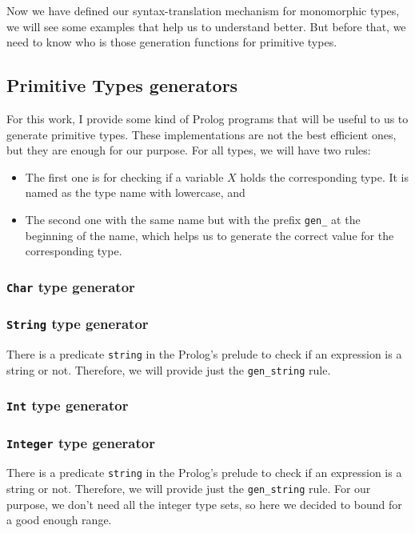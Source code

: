 \documentclass{report}
\theoremstyle{definition}
\theoremstyle{definition}
\newcommand{\ttt}[1]{\texttt{#1}}
\begin{document}
Now we have defined our syntax-translation mechanism for monomorphic types, we will see some examples that help us to understand better. But before that, we need to know who is those generation functions for primitive types.
\subsection{Primitive Types generators}
For this work, I provide some kind of Prolog programs that will be useful to us to generate primitive types. These implementations are not the best efficient ones, but they are enough for our purpose. For all types, we will have two rules:
\begin{itemize}
	\item The first one is for checking if a variable $X$ holds the corresponding type. It is named as the type name with lowercase, and
	\item The second one with the same name but with the prefix \ttt{gen\_} at the beginning of the name, which helps us to generate the correct value for the corresponding type.
\end{itemize}
\subsubsection{\ttt{Char} type generator}

\subsubsection{\ttt{String} type generator}
There is a predicate \ttt{string} in the Prolog's prelude to check if an expression is a string or not. Therefore, we will provide just the \ttt{gen\_string} rule.

\subsubsection{\ttt{Int} type generator}

\subsubsection{\ttt{Integer} type generator}
There is a predicate \ttt{string} in the Prolog's prelude to check if an expression is a string or not. Therefore, we will provide just the \ttt{gen\_string} rule. For our purpose, we don't need all the integer type sets, so here we decided to bound for a good enough range.

\end{document}
